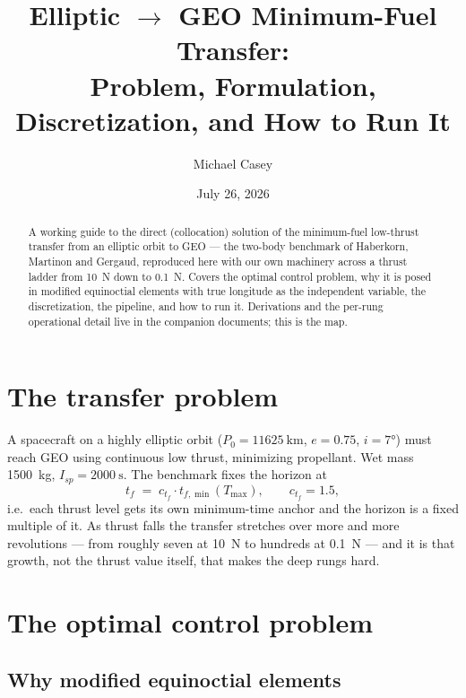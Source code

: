 \documentclass[11pt]{article}
\title{Elliptic $\to$ GEO Minimum-Fuel Transfer: \\
Problem, Formulation, Discretization, and How to Run It}
\author{Michael Casey}
\date{July 26, 2026}
\begin{document}
\maketitle

\begin{abstract}
A working guide to the direct (collocation) solution of the minimum-fuel
low-thrust transfer from an elliptic orbit to GEO --- the two-body benchmark of
Haberkorn, Martinon and Gergaud, reproduced here with our own machinery across
a thrust ladder from \SI{10}{\newton} down to \SI{0.1}{\newton}. Covers the
optimal control problem, why it is posed in modified equinoctial elements with
true longitude as the independent variable, the discretization, the pipeline,
and how to run it. Derivations and the per-rung operational detail live in the
companion documents; this is the map.
\end{abstract}

\tableofcontents

\section{The transfer problem}

A spacecraft on a highly elliptic orbit ($P_0=\SI{11625}{\kilo\meter}$,
$e=0.75$, $i=\ang{7}$) must reach GEO using continuous low thrust, minimizing
propellant. Wet mass \SI{1500}{\kilo\gram}, $I_{sp}=\SI{2000}{\second}$. The
benchmark fixes the horizon at
\begin{equation}
t_f \;=\; c_{t_f}\cdot t_{f,\min}(T_{\max}),
\qquad c_{t_f}=1.5 ,
\end{equation}
i.e.\ each thrust level gets its own minimum-time anchor and the horizon is a
fixed multiple of it. As thrust falls the transfer stretches over more and more
revolutions --- from roughly seven at \SI{10}{\newton} to hundreds at
\SI{0.1}{\newton} --- and it is that growth, not the thrust value itself, that
makes the deep rungs hard.

\section{The optimal control problem}

\subsection{Why modified equinoctial elements}
\end{document}
